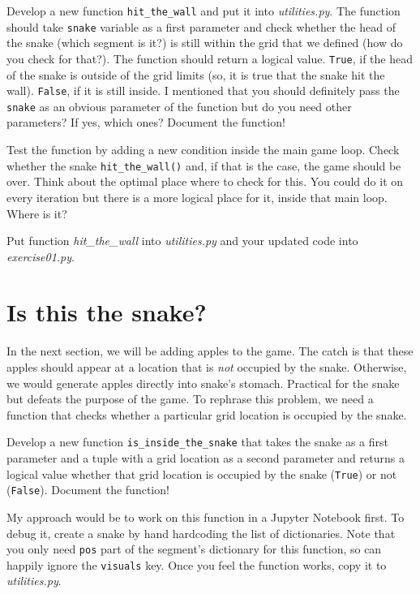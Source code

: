 \documentclass[
]{book}
\begin{document}
Develop a new function \texttt{hit\_the\_wall} and put it into \emph{utilities.py}. The function should take \texttt{snake} variable as a first parameter and check whether the head of the snake (which segment is it?) is still within the grid that we defined (how do you check for that?). The function should return a logical value. \texttt{True}, if the head of the snake is outside of the grid limits (so, it is true that the snake hit the wall). \texttt{False}, if it is still inside. I mentioned that you should definitely pass the \texttt{snake} as an obvious parameter of the function but do you need other parameters? If yes, which ones? Document the function!

Test the function by adding a new condition inside the main game loop. Check whether the snake \texttt{hit\_the\_wall()} and, if that is the case, the game should be over. Think about the optimal place where to check for this. You could do it on every iteration but there is a more logical place for it, inside that main loop. Where is it?

Put function \emph{hit\_the\_wall} into \emph{utilities.py} and your updated code into \emph{exercise01.py}.

\hypertarget{is-this-the-snake}{%
\section{Is this the snake?}\label{is-this-the-snake}}

In the next section, we will be adding apples to the game. The catch is that these apples should appear at a location that is \emph{not} occupied by the snake. Otherwise, we would generate apples directly into snake's stomach. Practical for the snake but defeats the purpose of the game. To rephrase this problem, we need a function that checks whether a particular grid location is occupied by the snake.

Develop a new function \texttt{is\_inside\_the\_snake} that takes the snake as a first parameter and a tuple with a grid location as a second parameter and returns a logical value whether that grid location is occupied by the snake (\texttt{True}) or not (\texttt{False}). Document the function!

My approach would be to work on this function in a Jupyter Notebook first. To debug it, create a snake by hand hardcoding the list of dictionaries. Note that you only need \texttt{pos} part of the segment's dictionary for this function, so can happily ignore the \texttt{visuals} key. Once you feel the function works, copy it to \emph{utilities.py}.
\end{document}
